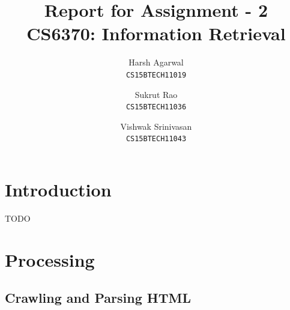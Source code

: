 \documentclass{article}
\title{Report for Assignment - 2 \\ CS6370: Information Retrieval}
\author{
Harsh Agarwal\\\texttt{CS15BTECH11019}
\and
Sukrut Rao\\\texttt{CS15BTECH11036}
\and
Vishwak Srinivasan\\\texttt{CS15BTECH11043}
}
\date{}
\begin{document}
\maketitle

\section{Introduction}
\begin{flushleft}
TODO
\end{flushleft}

\section{Processing}
\subsection{Crawling and Parsing HTML}
\end{document}
